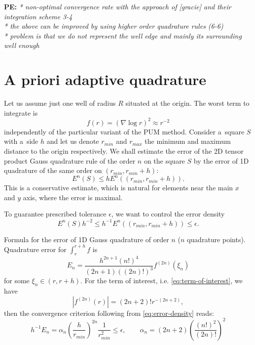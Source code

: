 \documentclass[preprint,12pt]{elsarticle}
\def\abs#1{\left|#1\right|}
\def\abs#1{| #1 |}
\newcommand{\notePE}[1]{{\color{Orange} \textbf{PE: } \textit{#1}}}
\begin{document}
\notePE{
* non-optimal convergence rate with the approach of [gracie] and their integration scheme 3-4\\
* the above can be improved by using higher order quadrature rules (6-6)\\
* problem is that we do not represent the well edge and mainly its surrounding well enough
}

\section{A priori adaptive quadrature}

Let us assume just one well of radius $R$ situated at the origin. The worst term to integrate is
\begin{equation}
    \label{eq:term-of-interest}
    f(r)=(\nabla \log r )^2 \approx r^{-2}
\end{equation}
%
independently of the particular variant of the PUM method. Consider a~square $S$ with a~side $h$ and 
let us denote $r_{min}$ and $r_{max}$ the minimum and maximum distance to the origin respectively.
We shall estimate the error of the 2D tensor product Gauss quadrature rule of the order $n$ on the square $S$  
by the error of 1D quadrature of the same order on $(r_{min}, r_{min}+h)$:
\[
  E^n(S) \le h E^n((r_{min}, r_{min}+h)).
\]
This is a conservative estimate, which is natural for elements near the main $x$ and $y$ axis, where the error is maximal.

To guarantee prescribed tolerance $\epsilon$, we want to control the error density
\begin{equation}
    \label{eq:error-density}
     E^n(S) h^{-2} \le h^{-1} E^n((r_{min}, r_{min}+h)) \le \epsilon. 
\end{equation}

Formula for the error of 1D Gauss quadrature of order $n$ ($n$ quadrature points). Quadrature error for $\int_r^{r+h} f$ is 
\[
  E_n = \frac{h^{2n+1} (n!)^4}{(2n+1)((2n)!)^3} f^{(2n)}(\xi_n) 
\]
for some $\xi_n \in (r, r+h)$. 
For the term of interest, i.e. \eqref{eq:term-of-interest}, we have 
\[
  \abs{f^{(2n)}(r)} = (2n+2)! r^{-(2n+2)},
\]
then the convergence criterion following from \eqref{eq:error-density} reads:
\[
  h^{-1}E_n = \alpha_n \left( \frac{h}{r_{min}} \right)^{2n} \frac{1}{r_{min}^2} \le \epsilon, 
  \qquad \alpha_n = (2n+2)\left( \frac{(n!)^2}{(2n)!} \right)^2
\]
\end{document}
